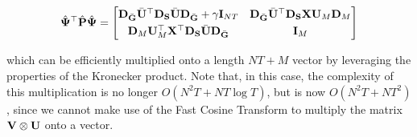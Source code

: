 \begin{equation*}
    \hat{\mathbf{\Psi}}^\top \hat{\mathbf{P}}  \hat{\mathbf{\Psi}} = 
       \begin{bmatrix}
        \mathbf{D}_{\bar{\mathbf{G}}} \bar{\mathbf{U}}^\top \mathbf{D}_{\mathbf{S}} \bar{\mathbf{U}} \mathbf{D}_{\bar{\mathbf{G}}} + \gamma \mathbf{I}_{NT}  &  \mathbf{D}_{\bar{\mathbf{G}}} \bar{\mathbf{U}}^\top \mathbf{D}_{\mathbf{S}} \mathbf{X} \mathbf{U}_M \mathbf{D}_M \\[0.1cm] 
        \mathbf{D}_M \mathbf{U}_M^\top \mathbf{X}^\top \mathbf{D}_{\mathbf{S}} \bar{\mathbf{U}} \mathbf{D}_{\bar{\mathbf{G}}} & \mathbf{I}_M
        \end{bmatrix}
\end{equation*}

which can be efficiently multiplied onto a length $NT + M$ vector by leveraging the properties of the Kronecker product. Note that, in this case, the complexity of this multiplication is no longer $O(N^2T + NT \log T)$, but is now $O(N^2T + NT^2)$, since we cannot make use of the Fast Cosine Transform to multiply the matrix $\mathbf{V} \otimes \mathbf{U}$ onto a vector. 
